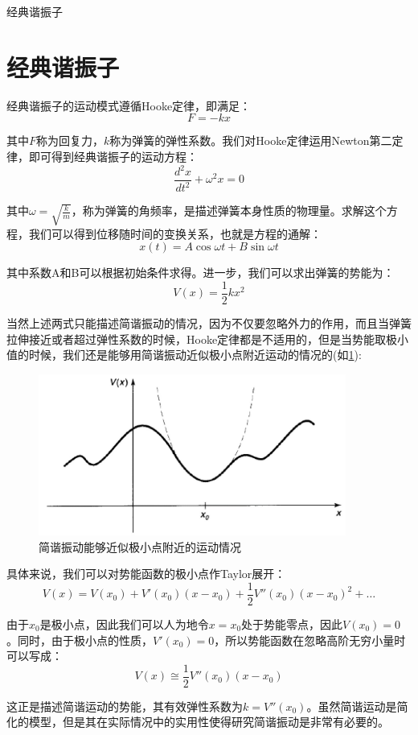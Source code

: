 \begin{introduction}
    \item 经典谐振子
\end{introduction}

\section{经典谐振子}
经典谐振子的运动模式遵循Hooke定律，即满足：
\begin{equation}
    F=-kx
\end{equation}

其中$F$称为回复力，$k$称为弹簧的弹性系数。我们对Hooke定律运用Newton第二定律，即可得到经典谐振子的运动方程：
\begin{equation}
    \frac{d^2x}{dt^2}+\omega^2x=0
\end{equation}

其中$\omega=\sqrt{\frac{k}{m}}$，称为弹簧的角频率，是描述弹簧本身性质的物理量。求解这个方程，我们可以得到位移随时间的变换关系，也就是方程的通解：
\begin{equation}
    x(t)=A\cos{\omega t}+B\sin{\omega t}
\end{equation}

其中系数A和B可以根据初始条件求得。进一步，我们可以求出弹簧的势能为：
\begin{equation}
    V(x)=\frac{1}{2}kx^2
\end{equation}

当然上述两式只能描述简谐振动的情况，因为不仅要忽略外力的作用，而且当弹簧拉伸接近或者超过弹性系数的时候，Hooke定律都是不适用的，但是当势能取极小值的时候，我们还是能够用简谐振动近似极小点附近运动的情况的(如\ref{fig:HookeLaw}):
\begin{figure}[H]
    \centering
    \includegraphics[width=0.9\textwidth]{figure/HookeLaw.jpg}
    \caption{简谐振动能够近似极小点附近的运动情况}
    \label{fig:HookeLaw}
\end{figure}

具体来说，我们可以对势能函数的极小点作Taylor展开：
\begin{equation}
    V(x)=V(x_0)+V'(x_0)(x-x_0)+\frac{1}{2}V''(x_0)(x-x_0)^2+\dots
\end{equation}

由于$x_0$是极小点，因此我们可以人为地令$x=x_0$处于势能零点，因此$V(x_0)=0$。同时，由于极小点的性质，$V'(x_0)=0$，所以势能函数在忽略高阶无穷小量时可以写成：
\begin{equation}
    V(x)\cong \frac{1}{2}V''(x_0)(x-x_0)
\end{equation}

这正是描述简谐运动的势能，其有效弹性系数为$k=V''(x_0)$。虽然简谐运动是简化的模型，但是其在实际情况中的实用性使得研究简谐振动是非常有必要的。